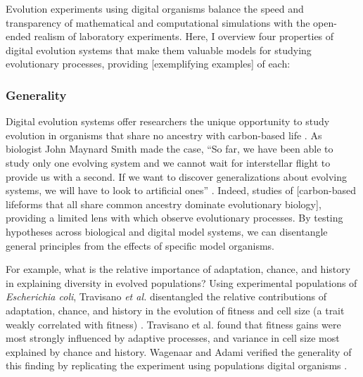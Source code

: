 Evolution experiments using digital organisms balance the speed and transparency of mathematical and computational simulations with the open-ended realism of laboratory experiments. 
Here, I overview four properties of digital evolution systems that make them valuable models for studying evolutionary processes, providing [exemplifying examples] of each:

\subsubsection{Generality}

Digital evolution systems offer researchers the unique opportunity to study evolution in organisms that share no ancestry with carbon-based life \citep{wilke_biology_2002}.
As biologist John Maynard Smith made the case, ``So far, we have been able to study only one evolving system and we cannot wait for interstellar flight to provide us with a second. If we want to discover generalizations about evolving systems, we will have to look to artificial ones'' \citep{maynard_smith_byte-sized_1992}.
Indeed, studies of [carbon-based lifeforms that all share common ancestry dominate evolutionary biology], providing a limited lens with which observe evolutionary processes.
By testing hypotheses across biological and digital model systems, we can disentangle general principles from the effects of specific model organisms.  



For example, what is the relative importance of adaptation, chance, and history in explaining diversity in evolved populations? 
Using experimental populations of \textit{Escherichia coli}, Travisano \textit{et al.} disentangled the relative contributions of adaptation, chance, and history in the evolution of fitness and cell size (a trait weakly correlated with fitness) \citep{travisano_experimental_1995}.
Travisano et al. found that fitness gains were most strongly influenced by adaptive processes, and variance in cell size most explained by chance and history. 
Wagenaar and Adami verified the generality of this finding by replicating the experiment using populations digital organisms \citep{wagenaar_influence_2004}.

